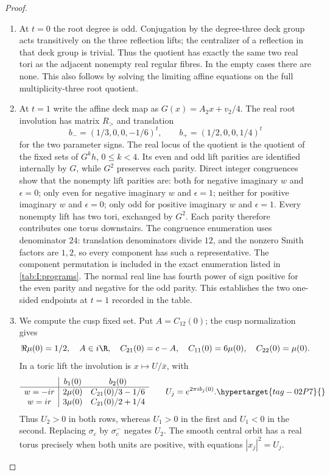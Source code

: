 \begin{proof}
\begin{enumerate}[label=\arabic*.,leftmargin=*]
\item At $t=0$ the root degree is odd. Conjugation by the degree-three deck
group acts transitively on the three reflection lifts; the centralizer
of a reflection in that deck group is trivial.
Thus the quotient has exactly the same two real tori as the adjacent
nonempty real regular fibres. In the empty cases there are none. This
also follows by solving the limiting affine equations on the full
multiplicity-three root quotient.

\item At $t=1$ write the affine deck map as
$G(x)=A_2x+v_2/4$. The real root involution has matrix $R_>$ and
translation
\[
 b_-=(1/3,0,0,-1/6)^t,
 \qquad b_+=(1/2,0,0,1/4)^t
\]
for the two parameter signs. The real locus of the quotient is the
quotient of the fixed sets of $G^kh$, $0\leq k<4$. Its even and odd
lift parities are identified internally by $G$, while $G^2$ preserves
each parity. Direct integer congruences show that the nonempty lift
parities are: both for negative imaginary $w$ and $\epsilon=0$; only even for
negative imaginary $w$ and $\epsilon=1$; neither for positive imaginary $w$ and $\epsilon=0$;
only odd for positive imaginary $w$ and $\epsilon=1$. Every nonempty lift has
two tori, exchanged by $G^2$. Each parity therefore contributes one
torus downstairs. The congruence enumeration uses denominator $24$:
translation denominators divide $12$, and the nonzero Smith factors are
$1,2$, so every component has such a representative. The component
permutation is included in the exact enumeration listed in
\cref{tab:I:programs}. The normal
real line has fourth power of sign positive for the even parity and
negative for the odd parity. This establishes the two one-sided
endpoints at $t=1$ recorded in the table.

\item We compute the cusp fixed set. Put
$A=C_{12}(0)$; the cusp normalization gives
\[
 \Re\mu(0)=1/2,\quad A\in i\R,\quad C_{21}(0)=c-A,
 \quad C_{11}(0)=6\mu(0),\quad C_{22}(0)=\mu(0).
\]
In a toric lift the involution is
$x\mapsto U/\bar x$, with
\begin{equation}
\begin{array}{c|cc}
 &b_1(0)&b_2(0)\\\hline
 w=-ir&2\mu(0)&C_{21}(0)/3-1/6\\
 w=ir&3\mu(0)&C_{21}(0)/2+1/4
\end{array}
\qquad U_j=e^{2\pi i b_j(0)}.
\hypertarget{tag-02P7}{}\label{mapsI:real-eq-7}
\end{equation}
Thus $U_2>0$ in both rows, whereas $U_1>0$ in the first and $U_1<0$
in the second. Replacing $\sigma_c$ by $\sigma_c^-$ negates $U_2$.
The smooth central orbit has a real torus precisely when both units
are positive, with equations $|x_j|^2=U_j$.


\end{enumerate}
\end{proof}
